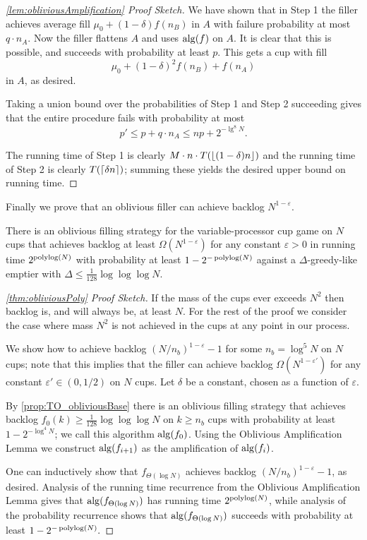\begin{proof}[\cref{lem:obliviousAmplification} Proof Sketch]
We have shown that in Step 1 the filler achieves average fill
$\mu_0 + (1-\delta)f(n_B)$ in $A$ with failure probability at
most $q \cdot n_A$.
Now the filler flattens $A$ and uses $\operatorname{\text{\textup{alg}}}(f)$ on $A$.
It is clear that this is possible, and succeeds with probability
at least $p$.
This gets a cup with fill 
$$\mu_0 + (1-\delta)^2 f(n_B) + f(n_A)$$
in $A$, as desired.

Taking a union bound over the probabilities of Step 1 and Step 2
succeeding gives that the entire procedure fails with probability
at most 
$$p' \le p + q \cdot n_A \le np + 2^{-\lg^8 N}.$$

The running time of Step 1 is clearly $M\cdot n\cdot
T(\left\lfloor (1-\delta)n \right\rfloor)$ and the running time of Step 2 is clearly
$T(\left\lceil \delta n \right\rceil)$; summing these yields the desired upper
bound on running time.

\end{proof}

Finally we prove that an oblivious filler can achieve backlog
$N^{1-\varepsilon}$. 
\begin{theorem}
  There is an oblivious filling strategy for the
  variable-processor cup game on $N$ cups that achieves backlog
  at least $\Omega(N^{1-\varepsilon})$ for any constant $\varepsilon
  >0$ in running time $2^{\operatorname{\text{polylog}}(N)}$ with probability at least
  $1-2^{-\operatorname{\text{polylog}}(N)}$ against a $\Delta$-greedy-like emptier
  with $\Delta \le \frac{1}{128} \log\log\log N$.
\end{theorem}
\begin{proof}[\cref{thm:obliviousPoly} Proof Sketch]
  If the mass of the cups ever exceeds $N^2$ then backlog is, and
  will always be, at least $N$. For the rest of the proof we
  consider the case where mass $N^2$ is not achieved in the cups
  at any point in our process.

  We show how to achieve backlog $(N/n_b)^{1-\varepsilon}-1$ for
  some $n_b = \log^5 N$ on $N$ cups; note that this implies
  that the filler can achieve backlog
  $\Omega(N^{1-\varepsilon'})$ for any constant $\varepsilon' \in
  (0,1/2)$ on $N$ cups. Let $\delta$ be a constant, chosen as a
  function of $\varepsilon$.

  By \cref{prop:TO_obliviousBase} there is an oblivious filling
  strategy that achieves backlog $f_0(k) \ge \frac{1}{128}\log\log\log N$ on
  $k \ge n_b$ cups with probability at least $1-2^{-\log^4 N}$; we call
  this algorithm $\operatorname{\text{\textup{alg}}}(f_0)$. Using the Oblivious Amplification
  Lemma we construct $\operatorname{\text{\textup{alg}}}(f_{i+1})$ as the amplification of
  $\operatorname{\text{\textup{alg}}}(f_i)$.

  One can inductively show that $f_{\Theta(\log N)}$ achieves
  backlog $(N/n_b)^{1-\varepsilon} -1$, as desired. 
  Analysis of the running time recurrence from the Oblivious Amplification
  Lemma gives that $\operatorname{\text{\textup{alg}}}(f_{\Theta(\log N)})$ has running time
  $2^{\operatorname{\text{polylog}}(N)}$, while analysis of the probability recurrence
  shows that $\operatorname{\text{\textup{alg}}}(f_{\Theta(\log N)})$ succeeds with probability
  at least $1-2^{-\operatorname{\text{polylog}}(N)}.$
\end{proof}

